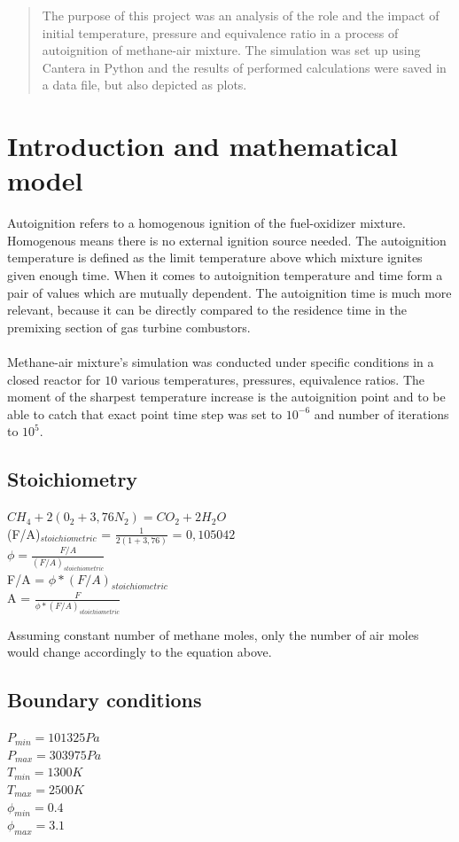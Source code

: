 \documentclass[a4paper]{article}
\date{}
\begin{document}

\newpage


\begin{abstract}
    The purpose of this project was an analysis of the role and the impact of initial temperature, pressure and equivalence ratio in a process of autoignition of methane-air mixture. The simulation was set up using Cantera in Python and the results of performed calculations were saved in a data file, but also depicted as plots.
\end{abstract}
\section{Introduction and mathematical model}
Autoignition refers to a homogenous ignition of the fuel-oxidizer mixture. Homogenous means there is no external ignition source needed. The autoignition temperature is defined as the limit temperature above which  mixture ignites given enough time. When it comes to autoignition temperature and time form a pair of values which are mutually dependent. The autoignition time is much more relevant, because it can be directly compared to the residence time in the premixing section of gas turbine combustors.\\\\
Methane-air mixture's simulation was conducted under specific conditions in a closed reactor for $10$ various temperatures, pressures, equivalence ratios. The moment of the sharpest temperature increase is the autoignition point and to be able to catch that exact point time step was set to $10^{-6}$ and number of iterations to $10^5$.
\subsection{Stoichiometry}
\begin{center}
    $CH_4 +2(0_2+3,76N_2)=CO_2+2H_2O$\\
    \bigskip
   (F/A)$_{stoichiometric}$ = \( \frac{1}{2(1+3,76)} \) = $0,105042$\\
   \bigskip
   $\phi =  \frac{F/A}{(F/A)_{stoichiometric}}$\\
   \bigskip
   F/A = $\phi*(F/A)_{stoichiometric}$\\
   \bigskip
   A = $\frac{F}{\phi*(F/A)_{stoichiometric}}$
\end{center}
Assuming constant number of methane moles, only the number of air moles would change accordingly to the equation above.     
\subsection{Boundary conditions}
\begin{center}
    $P_{min} = 101325 Pa$\\
    \bigskip
    $P_{max} = 303975 Pa$\\
    \bigskip
    $T_{min} = 1300 K$\\
    \bigskip
    $T_{max}= 2500 K$\\
    \bigskip
    $\phi_{min} = 0.4$\\
    \bigskip
    $\phi_{max} = 3.1$\\
\end{center}
\newpage
\end{document}
